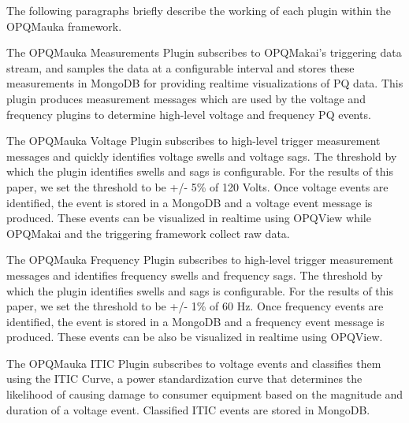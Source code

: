 \documentclass[a4paper, conference]{IEEEtran}
\begin{document}
The following paragraphs briefly describe the working of each plugin within the OPQMauka framework.

The OPQMauka Measurements Plugin subscribes to OPQMakai's triggering data stream, and samples the data at a configurable interval and stores these measurements in MongoDB for providing realtime visualizations of PQ data. This plugin produces measurement messages which are used by the voltage and frequency plugins to determine high-level voltage and frequency PQ events.

The OPQMauka Voltage Plugin subscribes to high-level trigger measurement messages and quickly identifies voltage swells and voltage sags. The threshold by which the plugin identifies swells and sags is configurable. For the results of this paper, we set the threshold to be +/- 5\% of 120 Volts. Once voltage events are identified, the event is stored in a MongoDB and a voltage event message is produced. These events can be visualized in realtime using OPQView while OPQMakai and the triggering framework collect raw data.

The OPQMauka Frequency Plugin subscribes to  high-level trigger measurement messages and identifies frequency swells and frequency sags. The threshold by which the plugin identifies swells and sags is configurable. For the results of this paper, we set the threshold to be +/- 1\% of 60 Hz. Once frequency events are identified, the event is stored in a MongoDB and a frequency event message is produced. These events can be also be visualized in realtime using OPQView.

The OPQMauka ITIC Plugin subscribes to voltage events and classifies them using the ITIC Curve\cite{ITIC}, a power standardization curve that determines the likelihood of causing damage to consumer equipment based on the magnitude and duration of a voltage event. Classified ITIC events are stored in MongoDB.

\end{document}
